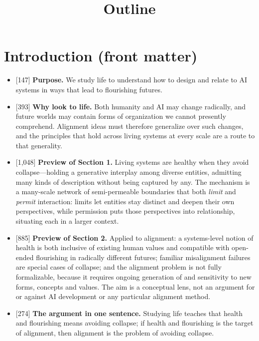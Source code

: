 \documentclass[11pt]{article}
\title{Outline}
\author{}
\date{}
\newcommand{\ct}[1]{{\footnotesize\color{black!55}[#1]}\hspace{1pt}}
\begin{document}
\maketitle
\vspace{-30pt}


\vspace{4pt}



\section*{Introduction (front matter)}

\begin{itemize}
  \item \ct{147} \textbf{Purpose.} We study life to understand how to design and relate to AI systems in ways that lead to flourishing futures.
  \item \ct{393} \textbf{Why look to life.} Both humanity and AI may change radically, and future worlds may contain forms of organization we cannot presently comprehend. Alignment ideas must therefore generalize over such changes, and the principles that hold across living systems at every scale are a route to that generality.
  \item \ct{1,048} \textbf{Preview of Section 1.} Living systems are healthy when they avoid collapse---holding a generative interplay among diverse entities, admitting many kinds of description without being captured by any. The mechanism is a many-scale network of semi-permeable boundaries that both \emph{limit} and \emph{permit} interaction: limits let entities stay distinct and deepen their own perspectives, while permission puts those perspectives into relationship, situating each in a larger context.
  \item \ct{885} \textbf{Preview of Section 2.} Applied to alignment: a systems-level notion of health is both inclusive of existing human values and compatible with open-ended flourishing in radically different futures; familiar misalignment failures are special cases of collapse; and the alignment problem is not fully formalizable, because it requires ongoing generation of and sensitivity to new forms, concepts and values. The aim is a conceptual lens, not an argument for or against AI development or any particular alignment method.
  \item \ct{274} \textbf{The argument in one sentence.} Studying life teaches that health and flourishing means avoiding collapse; if health and flourishing is the target of alignment, then alignment is the problem of avoiding collapse.
\end{itemize}
\end{document}
